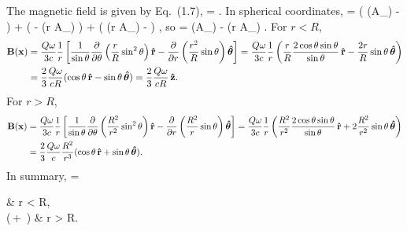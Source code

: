 \begin{solution}
	The magnetic field is given by Eq.~(1.7),
	\beqn \label{Bfield}
		\vB = \grad \times \vA.
	\eeqn
	In spherical coordinates,
	\beq
		\grad \times \vA =  \left(\pdv{}{\tht} (\sin\tht A_\vph) -  \right) \rh +  \left(   -  (r A_\vph) \right) \thh +  \left(  (r A_\tht) -  \right) \phh,
	\eeq
	so
	\beq
		\vB =  \pdv{}{\tht} (\sin\tht A_\vph) \rh -   (r A_\vph) \thh.
	\eeq
	For $r < R$,
	\begin{align*}
		\vb{B}(\vb{x}) &= \frac{Q \omega}{3 c} \frac{1}{r} \left[ \frac{1}{\sin\theta} \pdv{}{\theta} \left( \frac{r}{R} \sin^2\theta \right) \vb{\hat{r}} - \pdv{}{r} \left( \frac{r^2}{R} \sin\theta \right) \boldsymbol{\hat{\theta}} \right]
		= \frac{Q \omega}{3 c} \frac{1}{r} \left( \frac{r}{R} \frac{2 \cos\theta \sin\theta}{\sin\theta} \,\vb{\hat{r}} - \frac{2 r}{R} \sin\theta \,\boldsymbol{\hat{\theta}} \right) \\
		&= \frac{2}{3} \frac{Q \omega}{c R} (\cos\theta \,\vb{\hat{r}} - \sin\theta \,\boldsymbol{\hat{\theta}})
		= \frac{2}{3} \frac{Q \omega}{c R} \,\vb{\hat{z}}.
	\end{align*}
	For $r > R$,
	\begin{align*}
		\vb{B}(\vb{x}) &= \frac{Q \omega}{3 c} \frac{1}{r} \left[ \frac{1}{\sin\theta} \pdv{}{\theta} \left( \frac{R^2}{r^2} \sin^2\theta \right) \vb{\hat{r}} - \pdv{}{r} \left( \frac{R^2}{r} \sin\theta \right) \boldsymbol{\hat{\theta}} \right]
		= \frac{Q \omega}{3 c} \frac{1}{r} \left( \frac{R^2}{r^2} \frac{2 \cos\theta \sin\theta}{\sin\theta} \,\vb{\hat{r}} + 2 \frac{R^2}{r^2} \sin\theta \,\boldsymbol{\hat{\theta}} \right) \\
		&= \frac{2}{3} \frac{Q \omega}{c} \frac{R^2}{r^3} (\cos\theta \,\vb{\hat{r}} + \sin\theta \,\boldsymbol{\hat{\theta}}).
	\end{align*}
	In summary,
	\beq
		\vBx =   \begin{cases}
			 & r < R, \\[2ex]
			 (\cos\tht \,\rh + \sin\tht \,\thh) & r > R.
		\end{cases}
	\eeq
\end{solution}
\vfix